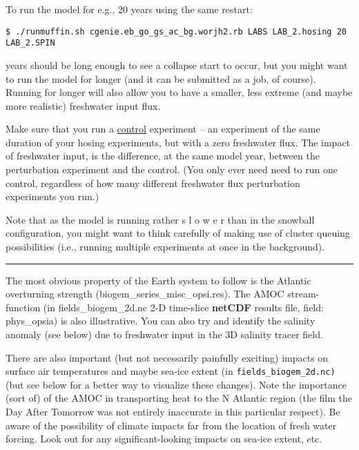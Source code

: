\vspace{1mm}
To run the model for e.g., 20 years using the same restart:

\vspace{-2mm}\small
\begin{verbatim}
$ ./runmuffin.sh cgenie.eb_go_gs_ac_bg.worjh2.rb LABS LAB_2.hosing 20 LAB_2.SPIN
\end{verbatim}
\normalsize\vspace{-2mm}

 years should be long enough to see a collapse start to occur, but you might want to run the model for longer (and it can be submitted as a job, of course). Running for longer will also allow you to have a smaller, less extreme (and maybe more realistic) freshwater input flux.

Make sure that you run a \uline{control} experiment -- an experiment of the same duration of your hosing experiments, but with a zero freshwater flux. The impact of freshwater input, is the difference, at the same model year, between the perturbation experiment and the control. (You only ever need need to run one control, regardless of how many different freshwater flux perturbation experiments  you run.) 

Note that as the model is running rather s l o w e r than in the snowball configuration, you might want to think carefully of making use of cluster queuing possibilities (i.e., running multiple experiments at once in the background).

\vspace{1mm}
\noindent\rule{4cm}{0.5pt}
\vspace{2mm}

\noindent The most obvious property of the Earth system to follow is the Atlantic overturning strength (\textsf{\footnotesize biogem\_series\_misc\_opsi.res}). The AMOC stream-function (in \textsf{\footnotesize fields\_biogem\_2d.nc} 2-D time-slice \textbf{netCDF} results file, field: \textsf{\footnotesize phys\_opsia}) is also illustrative. You can also try and identify the salinity anomaly (see below) due to freshwater input in the 3D salinity tracer field.

There are also important (but not necessarily painfully exciting) impacts on surface air temperatures and maybe sea-ice extent (in \texttt{fields\_biogem\_2d.nc)} (but see below for a better way to visualize these changes). Note the importance (sort of) of the AMOC in transporting heat to the N Atlantic region (the film the Day After Tomorrow was not entirely inaccurate in this particular respect). Be aware of the possibility of climate impacts far from the location of fresh water forcing. Look out for any significant-looking impacts on sea-ice extent, etc.

